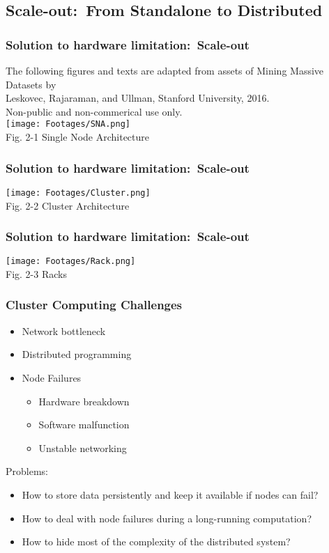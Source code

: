 \documentclass{beamer}
\begin{document}
\subsection{Scale-out:\ From Standalone to Distributed}
\begin{frame}
\frametitle{Solution to hardware limitation:\ Scale-out}
\begin{center}
  \tiny \color{gray} The following figures and texts are adapted from assets of Mining Massive Datasets by\\
  Leskovec, Rajaraman, and Ullman, Stanford University, 2016.\\
   Non-public and non-commerical use only.\\
  \texttt{[image: Footages/SNA.png]} \\
  \scriptsize \color{black} Fig. 2-1 Single Node Architecture
\end{center}
\end{frame}
\begin{frame}
\frametitle{Solution to hardware limitation:\ Scale-out}
\begin{center}
  \texttt{[image: Footages/Cluster.png]} \\
  \scriptsize Fig. 2-2 Cluster Architecture
\end{center}
\end{frame}
\begin{frame}
\frametitle{Solution to hardware limitation:\ Scale-out}
\begin{center}
  \texttt{[image: Footages/Rack.png]} \\
  \scriptsize Fig. 2-3 Racks
\end{center}
\end{frame}
\begin{frame} \small
\frametitle{Cluster Computing Challenges}
\begin{itemize}
  \item Network bottleneck
  \item Distributed programming
  \item Node Failures
  \begin{itemize}
    \item Hardware breakdown
    \item Software malfunction
    \item Unstable networking
  \end{itemize}
\end{itemize}
Problems:
\begin{itemize}
\item How to store data persistently and keep it available if nodes can fail?
\item How to deal with node failures during a long-running computation?
\item How to hide most of the complexity of the distributed system?
\end{itemize}
\end{frame}
\end{document}
